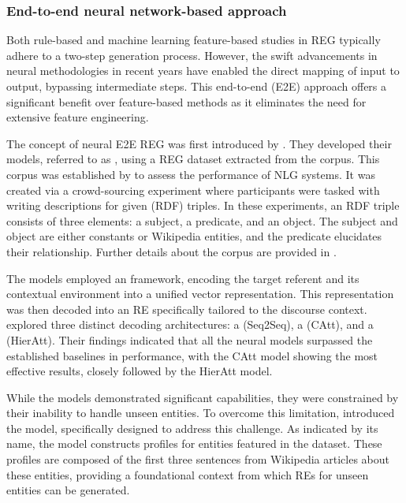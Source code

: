 \subsubsection{End-to-end neural network-based approach}\label{subsubsec:neuralbased}

Both rule-based and machine learning feature-based studies in REG typically adhere to a two-step generation process. However, the swift advancements in neural methodologies in recent years have enabled the direct mapping of input to output, bypassing intermediate steps. This  end-to-end (E2E) approach offers a significant benefit over feature-based methods as it eliminates the need for extensive feature engineering. 

The concept of neural E2E REG was first introduced by \citet{ferreira2018neuralreg}.
They developed their models, referred to as , using a REG dataset extracted from the \webnlg corpus. This corpus was established by \citet{gardent-etal-2017-creating} to assess the performance of NLG systems. It was created via a crowd-sourcing experiment where participants were tasked with writing descriptions for given  (RDF) triples. In these experiments, an RDF triple consists of three elements: a subject, a predicate, and an object. The subject and object are either constants or Wikipedia entities, and the predicate elucidates their relationship. Further details about the \webnlg corpus are provided in .

The  models employed an  framework, encoding the target referent and its contextual environment into a unified vector representation. This representation was then decoded into an RE specifically tailored to the discourse context. \citet{ferreira2018neuralreg} explored three distinct decoding architectures: a  (Seq2Seq), a  (CAtt), and a  (HierAtt). Their findings indicated that all the neural models surpassed the established baselines in performance, with the CAtt model showing the most effective results, closely followed by the HierAtt model.

While the  models demonstrated significant capabilities, they were constrained by their inability to handle unseen entities. To overcome this limitation, \citet{cao2019referring} introduced the  model, specifically designed to address this challenge. As indicated by its name, the model constructs profiles for entities featured in the \webnlg dataset. These profiles are composed of the first three sentences from Wikipedia articles about these entities, providing a foundational context from which REs for unseen entities can be generated.

